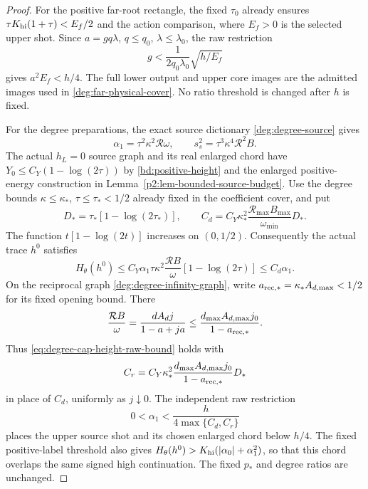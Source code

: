 \begin{proof}
For the positive far-root rectangle, the fixed \(\tau_0\) already
ensures \(\tau K_{\rm hi}(1+\tau)<E_f/2\) and the action comparison,
where \(E_f>0\) is the selected upper shot. Since
\(a=gq\lambda\), \(q\le q_0\), \(\lambda\le\lambda_0\), the
raw restriction
\begin{equation}\label{eq:regional-far-cap-bound}
g<\frac1{2q_0\lambda_0}\sqrt{h/E_f}
\end{equation}
gives \(a^2E_f<h/4\). The full lower output and upper core images
are the admitted images used in \eqref{deg:far-physical-cover}.
No ratio threshold is changed after \(h\) is fixed.

For the degree preparations, the exact source dictionary
\eqref{deg:degree-source} gives
\begin{equation}\label{eq:degree-cap-raw-identities}
\alpha_1=\tau^2\kappa^2\mathcal R\omega,\qquad
s_s^2=\tau^3\kappa^4\mathcal R^2B.
\end{equation}
The actual \(h_L=0\) source graph and its real enlarged chord have
\(Y_0\le C_Y(1-\log(2\tau))\) by
\eqref{bd:positive-height} and the enlarged positive-energy construction
in Lemma~\ref{p2:lem-bounded-source-budget}. Use the degree bounds
\(\kappa\le\kappa_*\), \(\tau\le\tau_*<1/2\) already fixed in
the coefficient cover, and put
\begin{equation}\label{eq:degree-cap-compact-constant}
D_*=\tau_*[1-\log(2\tau_*)],\qquad
C_d=C_Y\kappa_*^2
       \frac{\mathcal R_{\max}B_{\max}}{\omega_{\min}}D_*.
\end{equation}
The function \(t[1-\log(2t)]\) increases on \((0,1/2)\).
Consequently the actual trace \(h^0\) satisfies
\begin{equation}\label{eq:degree-cap-height-raw-bound}
H_\theta(h^0)\le C_Y\alpha_1\tau\kappa^2
       \frac{\mathcal RB}{\omega}[1-\log(2\tau)]
       \le C_d\alpha_1.
\end{equation}
On the reciprocal graph \eqref{deg:degree-infinity-graph}, write
\(a_{\rm rec,*}=\kappa_*A_{d,\max}<1/2\) for its fixed opening bound.
There
\[
\frac{\mathcal RB}{\omega}
=\frac{dA_dj}{1-a+ja}
\le\frac{d_{\max}A_{d,\max}j_0}{1-a_{\rm rec,*}}.
\]
Thus \eqref{eq:degree-cap-height-raw-bound} holds with
\begin{equation}\label{eq:degree-cap-reciprocal-constant}
C_r=C_Y\kappa_*^2
      \frac{d_{\max}A_{d,\max}j_0}{1-a_{\rm rec,*}}D_*
\end{equation}
in place of \(C_d\), uniformly as \(j\downarrow0\). The independent
raw restriction
\begin{equation}\label{eq:degree-cap-alpha-one-bound}
0<\alpha_1<\frac h{4\max\{C_d,C_r\}}
\end{equation}
places the upper source shot and its chosen enlarged chord below
\(h/4\). The fixed positive-label threshold also gives
\(H_\theta(h^0)>K_{\rm hi}(|\alpha_0|+\alpha_1^2)\), so that this
chord overlaps the same signed high continuation.
The fixed \(p_*\) and degree ratios are unchanged.


\end{proof}
